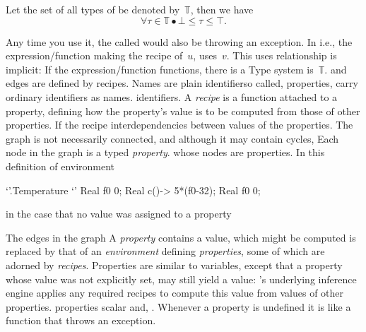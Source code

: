 Let the set of all types of \Reap be denoted by~$𝕋$, then
we have
\begin{equation}
  \label{eq:bounds}
  ∀τ∈𝕋 ∙ ⊥≤τ≤⊤.
\end{equation}

Any time you use it, the called would also be throwing an exception.
In i.e., the expression/function
making the
recipe of~$u$, uses~$v$. This uses relationship is implicit: If the
expression/function
functions,
there is a
Type system is~$𝕋$.
and edges are defined by recipes. Names are plain
identifierso called,
properties, carry ordinary identifiers as names.
identifiers.
A \emph{recipe}
is a function attached to a property, defining how the property's value
is to be computed from those of other properties. If the recipe
interdependencies between values
of the properties. The graph is not necessarily connected, and although it may
contain cycles,
Each node in the graph is a typed
\emph{property}. whose nodes are properties.
In this definition of environment~
\begin{reap}
  `'.Temperature {`'
    Real f0 0;
    Real c()-> 5*(f0-32);
    Real f0 0;
  }
\end{reap}
in the case that no value was assigned to a property
\begin{reap} \end{reap}
The edges in the graph
A \emph{property}
contains a value, which might be computed
is replaced by that of an \emph{environment} defining \emph{properties}, some
of which are adorned by \emph{recipes}. Properties are similar to variables,
except that a property whose value was not explicitly set, may still yield a
value: \Reap's underlying inference engine applies any required recipes to
compute this value from values of other properties.
properties scalar
and,
.
Whenever a property is undefined it is like a function that throws an exception.

